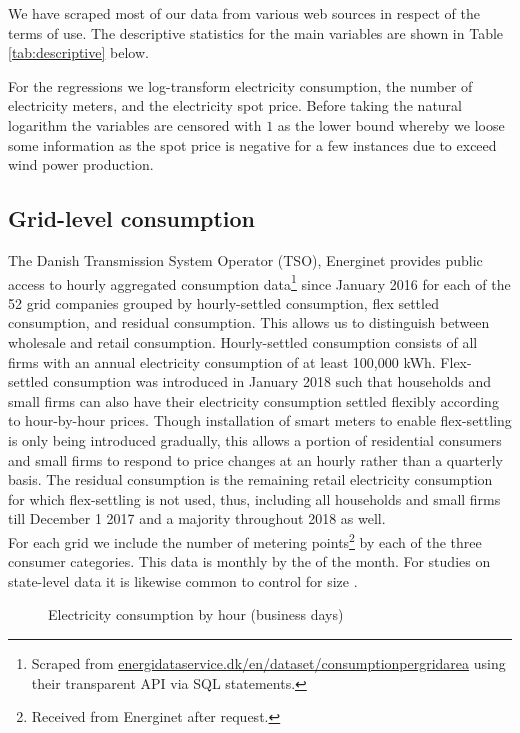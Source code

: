 \label{sec:data}
We have scraped most of our data from various web sources in respect of the terms of use. The descriptive statistics for the main variables are shown in Table \ref{tab:descriptive} below.
\par
For the regressions we log-transform electricity consumption, the number of electricity meters, and the electricity spot price. Before taking the natural logarithm the variables are censored with $1$ as the lower bound whereby we loose some information as the spot price is negative for a few instances due to exceed wind power production.

\subsection{Grid-level consumption}
\label{subsec:d_consumption}
The Danish Transmission System Operator (TSO), Energinet provides public access to hourly aggregated consumption data\footnote{Scraped from \href{https://www.energidataservice.dk/en/dataset/consumptionpergridarea/}{energidataservice.dk/en/dataset/consumptionpergridarea} using their transparent API via SQL statements.} since January 2016 for each of the 52 grid companies grouped by hourly-settled consumption, flex settled consumption, and residual consumption. This allows us to distinguish between wholesale and retail consumption. Hourly-settled consumption consists of all firms with an annual electricity consumption of at least 100,000 kWh. Flex-settled consumption was introduced in January 2018 such that households and small firms can also have their electricity consumption settled flexibly according to hour-by-hour prices. Though installation of smart meters to enable flex-settling is only being introduced gradually, this allows a portion of residential consumers and small firms to respond to price changes at an hourly rather than a quarterly basis. The residual consumption is the remaining retail electricity consumption for which flex-settling is not used, thus, including all households and small firms till December 1 2017 and a majority throughout 2018 as well.
\medskip\\
For each grid we include the number of metering points\footnote{Received from Energinet after request.} by each of the three consumer categories. This data is monthly by the  of the month. For studies on state-level data it is likewise common to control for size \citep{burke2017price}.
\begin{figure}[H]
  \centering
  \caption{Electricity consumption by hour (business days)}
  \label{fig:cons_hour}
\end{figure}


